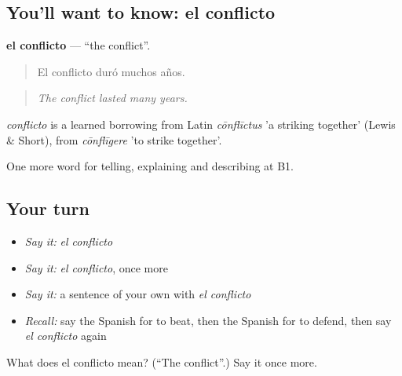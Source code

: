 \subsection*{You'll want to know: el conflicto}
\textbf{el conflicto} — \textquotedblleft{}the conflict\textquotedblright{}.

\begin{quote}
El conflicto duró muchos años.
\end{quote}

\begin{quote}
\emph{The conflict lasted many years.}
\end{quote}

\begin{cousinweb}
\emph{conflicto} is a learned borrowing from Latin \emph{cōnflīctus} 'a striking together' (Lewis \& Short), from \emph{cōnflīgere} 'to strike together'.
\end{cousinweb}

\begin{grammarlens}[title={What you've built}]
One more word for telling, explaining and describing at B1.
\end{grammarlens}

\subsection*{Your turn}
\begin{itemize}
\raggedright
  \item \emph{Say it:} \emph{el conflicto}
  \item \emph{Say it:} \emph{el conflicto}, once more
  \item \emph{Say it:} a sentence of your own with \emph{el conflicto}
  \item \emph{Recall:} say the Spanish for to beat, then the Spanish for to defend, then say \emph{el conflicto} again
\end{itemize}

\begin{tcolorbox}[breakable,colback=teal!4,colframe=teal!35!black,title={Before you move on}]
What does el conflicto mean? (\textquotedblleft{}The conflict\textquotedblright{}.) Say it once more.
\end{tcolorbox}
